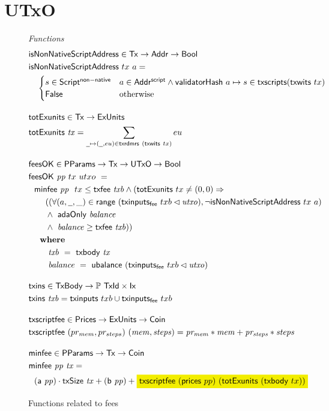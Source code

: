 \section{UTxO}
\label{sec:utxo}

\begin{figure*}[htb]
  \emph{Functions}
  \begin{align*}
    & \fun{isNonNativeScriptAddress} \in \Tx \to \Addr \to \Bool \\
    & \fun{isNonNativeScriptAddress}~tx~a = \\
      &\quad\begin{cases}
        s \in \ScriptNonNative & a \in \AddrScr \land \fun{validatorHash}~a \mapsto s \in \fun{txscripts} (\fun{txwits}~tx) \\
        \False & \text{otherwise}
      \end{cases}
                 \nextdef
    & \fun{totExunits} \in \Tx \to \ExUnits \\
    & \fun{totExunits}~\var{tx} = \sum_{\wcard \mapsto (\wcard, eu) \in \fun{txrdmrs}~(\fun{txwits}~tx)} eu
    \nextdef
    & \fun{feesOK} \in \PParams \to \Tx \to \UTxO \to \Bool  \\
    & \fun{feesOK}~\var{pp}~tx~utxo~= \\
    &~~      \minfee{pp}~{tx} \leq \txfee{txb} \wedge (\fun{totExunits}~tx \neq (0, 0) \Rightarrow \\
    &~~~~~~((\forall (a, \wcard, \_) \in \fun{range}~(\fun{txinputs_{fee}}~{txb} \restrictdom \var{utxo}), \neg \fun{isNonNativeScriptAddress}~tx~a) \\
    &~~~~~~\wedge~ \fun{adaOnly}~\var{balance} \\
    &~~~~~~      \wedge~ \var{balance} \geq \txfee{txb})) \\
    &~~      \where \\
    & ~~~~~~~ \var{txb}~=~\txbody{tx} \\
    & ~~~~~~~ \var{balance}~=~\fun{ubalance}~(\fun{txinputs_{fee}}~{txb} \restrictdom \var{utxo})
    \nextdef
    & \fun{txins} \in \TxBody \to \powerset{\TxId \times \Ix} \\
    & \fun{txins} ~\var{txb} = \fun{txinputs}~txb \cup \fun{txinputs_{fee}}~txb
    \nextdef
    & \fun{txscriptfee} \in \Prices \to \ExUnits \to \Coin \\
    & \fun{txscriptfee}~(pr_{mem}, pr_{steps})~ (\var{mem, steps})
    = \var{pr_{mem}}*\var{mem} + \var{pr_{steps}}*\var{steps}
    \nextdef
    &\fun{minfee} \in \PParams \to \Tx \to \Coin \\
    &\fun{minfee}~\var{pp}~\var{tx} = \\
    &~~(\fun{a}~\var{pp}) \cdot \fun{txSize}~\var{tx} + (\fun{b}~\var{pp}) +
    \hldiff{\fun{txscriptfee}~(\fun{prices}~{pp})~(\fun{totExunits}~(\fun{txbody}~{tx}))}
  \end{align*}
  \caption{Functions related to fees}
  \label{fig:functions:utxo}
\end{figure*}

